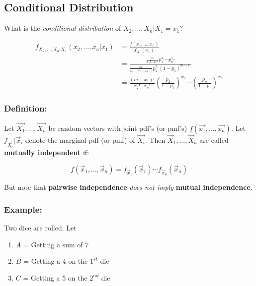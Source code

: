 \documentclass{article}
\begin{document}
\subsection{Conditional Distribution}

What is the \textit{conditional distribution} of $X_2,...,X_n | X_1 = x_1$?

\begin{equation*}
    \begin{split}
        f_{X_2,...,X_n | X_1} (x_2,...,x_n | x_1) &= \frac{f(x_1,...,x_n)}{f_{X_1}(x_1)}\\
        &= \frac{\frac{m!}{x_1!\cdots x_n!} p_1^{x_1} \cdots p_n^{x_n}}{\frac{m!}{x_1! (m-x_1)!}p_1^{x_1}(1-p_1)^{m-x_1}}\\
        &= \frac{(m-x_1)!}{x_2!\cdots x_n!}  \left(\frac{p_2}{1-p_1}\right)^{x_2} \cdots \left(\frac{p_n}{1-p_1}\right)^{x_n}
    \end{split}
\end{equation*}

\subsubsection*{Definition:}

Let $\vec{X_1},...,\vec{X_n}$ be random vectors with joint pdf's (or pmf's) $f(\vec{x_1},...,\vec{x_n})$. Let $f_{\vec{X}_i}(\vec{x}_i$ denote the marginal pdf (or pmf) of $\vec{X_i}$. Then $\vec{X}_1,...,\vec{X}_n$ are called \textbf{mutually independent} if:

\begin{equation*}
    f(\vec{x}_1, ...,\vec{x}_n) = f_{\vec{x}_1}(\vec{x}_1) \cdots f_{\vec{x}_n}(\vec{x}_n)
\end{equation*}

But note that \textbf{pairwise independence} \textit{does not imply} \textbf{mutual independence}.

\subsubsection*{Example:}

Two dice are rolled. Let
\begin{enumerate}
    \item $A$ = Getting a sum of 7
    \item $B$ = Getting a 4 on the $1^{st}$ die
    \item $C$ = Getting a 5 on the $2^{nd}$ die
\end{enumerate}
\end{document}
